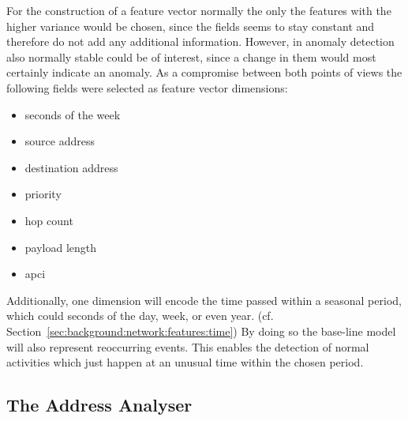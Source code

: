 For the construction of a feature vector normally the only the features with the higher variance would be chosen, since the fields seems to stay constant and therefore do not add any additional information.
However, in anomaly detection also normally stable could be of interest, since a change in them would most certainly indicate an anomaly.
As a compromise between both points of views the following fields were selected as feature vector dimensions:

\begin{itemize}
	\item seconds of the week
	\item source address
	\item destination address
	\item priority
	\item hop count
	\item payload length
	\item \gls{apci}
\end{itemize}

Additionally, one dimension will encode the time passed within a seasonal period, which could seconds of the day, week, or even year. (cf. Section~\ref{sec:background:network:features:time}) By doing so the base-line model will also represent reoccurring events. This enables the detection of normal activities which just happen at an unusual time within the chosen period.

\subsection{The Address Analyser}
\label{sec:concept:anal:addr}

